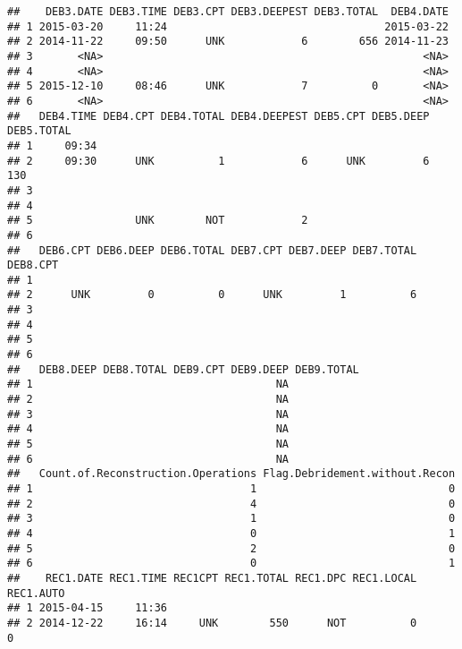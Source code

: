 \documentclass[]{article}
\begin{document}
\begin{verbatim}
##    DEB3.DATE DEB3.TIME DEB3.CPT DEB3.DEEPEST DEB3.TOTAL  DEB4.DATE
## 1 2015-03-20     11:24                                  2015-03-22
## 2 2014-11-22     09:50      UNK            6        656 2014-11-23
## 3       <NA>                                                  <NA>
## 4       <NA>                                                  <NA>
## 5 2015-12-10     08:46      UNK            7          0       <NA>
## 6       <NA>                                                  <NA>
##   DEB4.TIME DEB4.CPT DEB4.TOTAL DEB4.DEEPEST DEB5.CPT DEB5.DEEP DEB5.TOTAL
## 1     09:34                                                               
## 2     09:30      UNK          1            6      UNK         6        130
## 3                                                                         
## 4                                                                         
## 5                UNK        NOT            2                              
## 6                                                                         
##   DEB6.CPT DEB6.DEEP DEB6.TOTAL DEB7.CPT DEB7.DEEP DEB7.TOTAL DEB8.CPT
## 1                                                                     
## 2      UNK         0          0      UNK         1          6         
## 3                                                                     
## 4                                                                     
## 5                                                                     
## 6                                                                     
##   DEB8.DEEP DEB8.TOTAL DEB9.CPT DEB9.DEEP DEB9.TOTAL
## 1                                      NA           
## 2                                      NA           
## 3                                      NA           
## 4                                      NA           
## 5                                      NA           
## 6                                      NA           
##   Count.of.Reconstruction.Operations Flag.Debridement.without.Recon
## 1                                  1                              0
## 2                                  4                              0
## 3                                  1                              0
## 4                                  0                              1
## 5                                  2                              0
## 6                                  0                              1
##    REC1.DATE REC1.TIME REC1CPT REC1.TOTAL REC1.DPC REC1.LOCAL REC1.AUTO
## 1 2015-04-15     11:36                                                 
## 2 2014-12-22     16:14     UNK        550      NOT          0         0

\end{verbatim}
\end{document}
